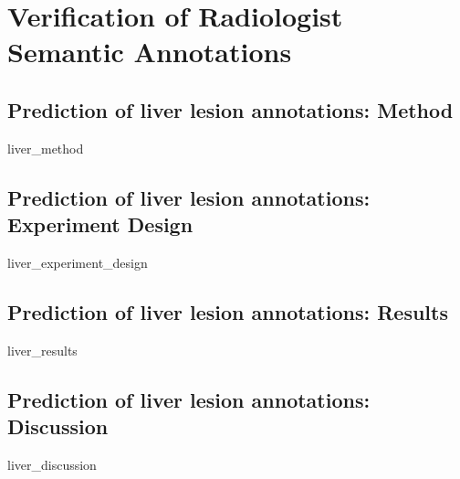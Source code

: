 \chapter{Verification of Radiologist Semantic Annotations}

\section{Prediction of liver lesion annotations: Method}
{liver_method}

\section{Prediction of liver lesion annotations: Experiment Design}
{liver_experiment_design}

\section{Prediction of liver lesion annotations: Results}
{liver_results}

\section{Prediction of liver lesion annotations: Discussion}
{liver_discussion}